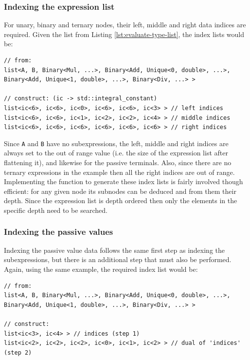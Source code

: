 \documentclass[a4paper,10pt]{article}
\begin{document}
\subsubsection{Indexing the expression list}
For unary, binary and ternary nodes, their left, middle and right data indices are required. Given the list from Listing \ref{lst:evaluate-type-list}, the index lists would be:\newline
\begin{lstlisting}[caption={Generating the left, middle and right indices.}, label=lst:expression-indices]
// from:
list<A, B, Binary<Mul, ...>, Binary<Add, Unique<0, double>, ...>, Binary<Add, Unique<1, double>, ...>, Binary<Div, ...> >

// construct: (ic -> std::integral_constant)
list<ic<6>, ic<6>, ic<0>, ic<6>, ic<6>, ic<3> > // left indices
list<ic<6>, ic<6>, ic<1>, ic<2>, ic<2>, ic<4> > // middle indices
list<ic<6>, ic<6>, ic<6>, ic<6>, ic<6>, ic<6> > // right indices
\end{lstlisting}
Since \texttt{A} and \texttt{B} have no subexpressions, the left, middle and right indices are always set to the out of range value (i.e. the size of the expression list after flattening it), and likewise for the passive terminals. Also, since there are no ternary expressions in the example then all the right indices are out of range. Implementing the function to generate these index lists is fairly involved though efficient: for any given node its subnodes can be deduced and from them their depth. Since the expression list is depth ordered then only the elements in the specific depth need to be searched.

\subsubsection{Indexing the passive values}
Indexing the passive value data follows the same first step as indexing the subexpressions, but there is an additional step that must also be performed. Again, using the same example, the required index list would be:\newline
\begin{lstlisting}[caption={Generating the passive value mapping.}, label=lst:passive-indices]
// from:
list<A, B, Binary<Mul, ...>, Binary<Add, Unique<0, double>, ...>, Binary<Add, Unique<1, double>, ...>, Binary<Div, ...> >

// construct:
list<ic<3>, ic<4> > // indices (step 1)
list<ic<2>, ic<2>, ic<2>, ic<0>, ic<1>, ic<2> > // dual of 'indices' (step 2)
\end{lstlisting}
\end{document}
